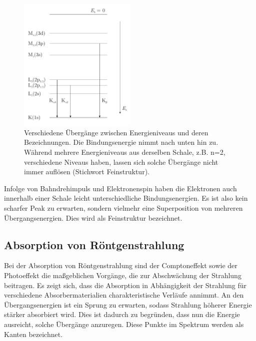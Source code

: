 \begin{figure}
  \centering
  \includegraphics[width=0.5\textwidth]{ressources/transitions.pdf}
  \caption{Verschiedene Übergänge zwischen Energieniveaus und deren Bezeichnungen. Die Bindungsenergie nimmt nach unten hin zu. Während mehrere Energieniveaus aus derselben Schale, z.B. n=2, verschiedene Niveaus haben, lassen sich solche Übergänge nicht immer auflösen (Stichwort Feinstruktur).}
  \label{fig:transitions}
\end{figure}
Infolge von Bahndrehimpuls und Elektronenspin haben die Elektronen auch innerhalb einer Schale leicht unterschiedliche Bindungsenergien. Es ist also kein scharfer Peak zu erwarten, sondern vielmehr eine Superposition von mehreren Übergangsenergien. Dies wird als Feinstruktur bezeichnet.

\subsection{Absorption von Röntgenstrahlung}
Bei der Absorption von Röntgenstrahlung sind der Comptoneffekt sowie der Photoeffekt die maßgeblichen Vorgänge, die zur Abschwächung der Strahlung beitragen. Es zeigt sich, dass die Absorption in Abhängigkeit der Strahlung für verschiedene Absorbermaterialien charakteristische Verläufe annimmt. An den Übergangsenergien ist ein Sprung zu erwarten, sodass Strahlung höherer Energie stärker absorbiert wird. Dies ist dadurch zu begründen, dass nun die Energie ausreicht, solche Übergänge anzuregen. Diese Punkte im Spektrum werden als Kanten bezeichnet.


